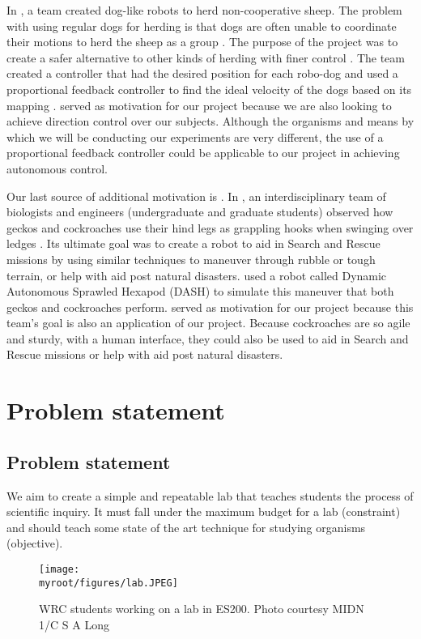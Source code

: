 \documentclass[twocolumn,10pt]{IEEEtran}
\newcommand{\myroot}{.}
\begin{document}
In \cite{pierson2015bioinspired}, a team created dog-like robots to herd non-cooperative sheep. The problem with using regular dogs for herding is that dogs are often unable to coordinate their motions to herd the sheep as a group \cite{pierson2015bioinspired}. The purpose of the project was to create a safer alternative to other kinds of herding with finer control \cite{pierson2015bioinspired}. The team created a controller that had the desired position for each robo-dog and used a proportional feedback controller to find the ideal velocity of the dogs based on its mapping \cite{pierson2015bioinspired}. \cite{pierson2015bioinspired} served as motivation for our project because we are also looking to achieve direction control over our subjects. Although the organisms and means by which we will be conducting our experiments are very different, the use of a proportional feedback controller could be applicable to our project in achieving autonomous control. 

Our last source of additional motivation is \cite{mongeau2012rapid}. In \cite{mongeau2012rapid}, an interdisciplinary team of biologists and engineers (undergraduate and graduate students)  observed how geckos and cockroaches use their hind legs as grappling hooks when swinging over ledges \cite{mongeau2012rapid}. Its ultimate goal was to create a robot to aid in Search and Rescue missions by using similar techniques to maneuver through rubble or tough terrain, or help with aid post natural disasters. \cite{mongeau2012rapid} used  a robot called Dynamic Autonomous Sprawled Hexapod (DASH) to simulate this maneuver that both geckos and cockroaches perform. \cite{mongeau2012rapid} served as motivation for our project because this team's goal is also an application of our project. Because cockroaches are so agile and sturdy, with a human interface, they could also be used to aid in Search and Rescue missions or help with aid post natural disasters.

\section{Problem statement}
\subsection{Problem statement}
We aim to create a simple and repeatable lab that teaches students the process of scientific inquiry. It must fall under the maximum budget for a lab (constraint) and should teach some state of the art technique for studying organisms (objective).
\begin{figure}[ht!]
\centering
\texttt{[image: \\myroot/figures/lab.JPEG]}
\caption{WRC students working on a lab in ES200. Photo courtesy MIDN 1/C S A Long}
\label{fig:hollywood}
\end{figure}
\end{document}
